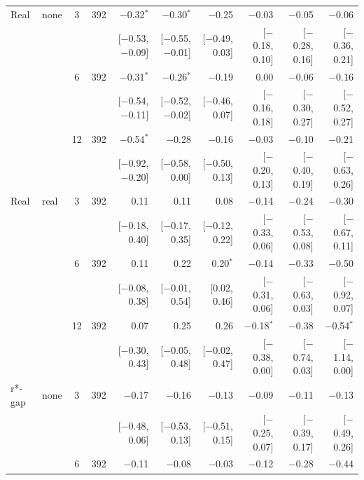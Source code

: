 \begin{table}[p]
\begin{tabular}{llcrrrrrrr}
\addlinespace
Real & none & 3 & 392 & $-$0.32$^{*}$ & $-$0.30$^{*}$ & $-$0.25 & $-$0.03 & $-$0.05 & $-$0.06\\
 & & & & {\scriptsize [$-$0.53, $-$0.09]} & {\scriptsize [$-$0.55, $-$0.01]} & {\scriptsize [$-$0.49, 0.03]} & {\scriptsize [$-$0.18, 0.10]} & {\scriptsize [$-$0.28, 0.16]} & {\scriptsize [$-$0.36, 0.21]}\\
 &  & 6 & 392 & $-$0.31$^{*}$ & $-$0.26$^{*}$ & $-$0.19 & 0.00 & $-$0.06 & $-$0.16\\
 & & & & {\scriptsize [$-$0.54, $-$0.11]} & {\scriptsize [$-$0.52, $-$0.02]} & {\scriptsize [$-$0.46, 0.07]} & {\scriptsize [$-$0.16, 0.18]} & {\scriptsize [$-$0.30, 0.27]} & {\scriptsize [$-$0.52, 0.27]}\\
 &  & 12 & 392 & $-$0.54$^{*}$ & $-$0.28 & $-$0.16 & $-$0.03 & $-$0.10 & $-$0.21\\
 & & & & {\scriptsize [$-$0.92, $-$0.20]} & {\scriptsize [$-$0.58, 0.00]} & {\scriptsize [$-$0.50, 0.13]} & {\scriptsize [$-$0.20, 0.13]} & {\scriptsize [$-$0.40, 0.19]} & {\scriptsize [$-$0.63, 0.26]}\\
Real & real & 3 & 392 & 0.11 & 0.11 & 0.08 & $-$0.14 & $-$0.24 & $-$0.30\\
 & & & & {\scriptsize [$-$0.18, 0.40]} & {\scriptsize [$-$0.17, 0.35]} & {\scriptsize [$-$0.12, 0.22]} & {\scriptsize [$-$0.33, 0.06]} & {\scriptsize [$-$0.53, 0.08]} & {\scriptsize [$-$0.67, 0.11]}\\
 &  & 6 & 392 & 0.11 & 0.22 & 0.20$^{*}$ & $-$0.14 & $-$0.33 & $-$0.50\\
 & & & & {\scriptsize [$-$0.08, 0.38]} & {\scriptsize [$-$0.01, 0.54]} & {\scriptsize [0.02, 0.46]} & {\scriptsize [$-$0.31, 0.06]} & {\scriptsize [$-$0.63, 0.03]} & {\scriptsize [$-$0.92, 0.07]}\\
 &  & 12 & 392 & 0.07 & 0.25 & 0.26 & $-$0.18$^{*}$ & $-$0.38 & $-$0.54$^{*}$\\
 & & & & {\scriptsize [$-$0.30, 0.43]} & {\scriptsize [$-$0.05, 0.48]} & {\scriptsize [$-$0.02, 0.47]} & {\scriptsize [$-$0.38, 0.00]} & {\scriptsize [$-$0.74, 0.03]} & {\scriptsize [$-$1.14, 0.00]}\\
\addlinespace
r*-gap & none & 3 & 392 & $-$0.17 & $-$0.16 & $-$0.13 & $-$0.09 & $-$0.11 & $-$0.13\\
 & & & & {\scriptsize [$-$0.48, 0.06]} & {\scriptsize [$-$0.53, 0.13]} & {\scriptsize [$-$0.51, 0.15]} & {\scriptsize [$-$0.25, 0.07]} & {\scriptsize [$-$0.39, 0.17]} & {\scriptsize [$-$0.49, 0.26]}\\
 &  & 6 & 392 & $-$0.11 & $-$0.08 & $-$0.03 & $-$0.12 & $-$0.28 & $-$0.44\\

\end{tabular}
\end{table}
